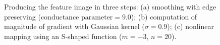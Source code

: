 \begin{figure}[t]
\centering
\hfil
\hfil
\caption{Producing the feature image in three steps: (a) smoothing with edge preserving ($\text{conductance parameter} = 9.0$); (b) computation of magnitude of gradient with Gaussian kernel ($\sigma = 0.9$); (c) nonlinear mapping using an S-shaped function ($m = -3$, $n = 20$).}
\label{fig:PotentialImageGeneration}
\end{figure}
